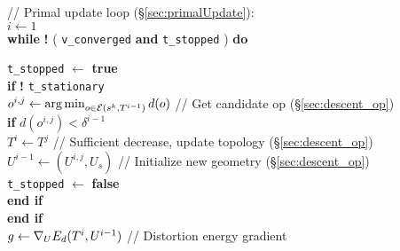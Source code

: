 \begin{algorithm}[h!]
\hspace{10pt} // Primal update loop (\S\ref{sec:primalUpdate}): \\
\hspace{10pt} $i \leftarrow 1$ \\
\hspace{10pt} \textbf{while}  \textbf{!}  ( \texttt{v\_converged} \hspace{2pt} \textbf{and} \hspace{2pt}  \texttt{t\_stopped} ) \hspace{2pt}   \textbf{do} 

\hspace{20pt} \texttt{t\_stopped} $\leftarrow$ \textbf{true} \\
\hspace{20pt} \textbf{if}  \textbf{!} \texttt{t\_stationary} \\
\hspace{30pt} $o^{i,j} \leftarrow \operatorname*{arg\,min}_{o \in \mathcal{E}(s^k, T^{i-1})} d(o)$ \hspace{3pt}// Get candidate op (\S\ref{sec:descent_op})  \\
\hspace{30pt} \textbf{if} $d(o^{i,j}) < \delta^{i-1}$ \\
\hspace{40pt} $T^i \leftarrow T^j$ \hspace{10pt} // Sufficient decrease, update topology (\S\ref{sec:descent_op}) \\
\hspace{40pt} $U^{i-1} \leftarrow (U^{i,j}, U_s) $ \hspace{10pt} // Initialize new geometry (\S\ref{sec:descent_op}) \\
\hspace{40pt} \texttt{t\_stopped} $\leftarrow$ \textbf{false} \\
\hspace{30pt} \textbf{end if} \\
\hspace{20pt} \textbf{end if} \\

\hspace{20pt}  $g \leftarrow \nabla_{\small{U}} E_{d}(T^i,U^{i-1})$ \hspace{10pt}//  Distortion energy gradient 


\end{algorithm}
